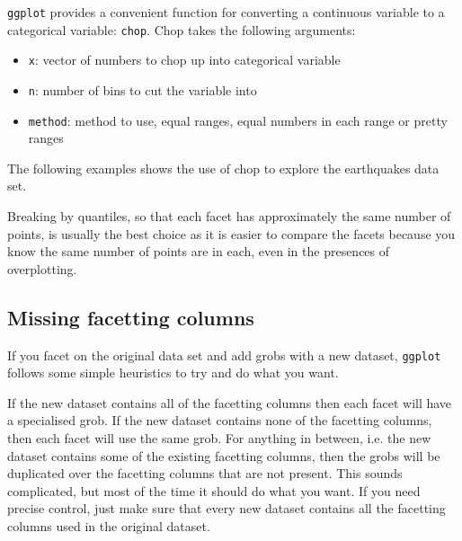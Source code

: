 {\tt ggplot} provides a convenient function for converting a continuous variable to a categorical variable: {\tt chop}.  Chop takes the following arguments:

\begin{itemize}
	\item {\tt x}: vector of numbers to chop up into categorical variable
	\item {\tt n}: number of bins to cut the variable into
	\item {\tt method}: method to use, equal ranges, equal numbers in each range or pretty ranges
\end{itemize}

The following examples shows the use of chop to explore the earthquakes data set.


Breaking by quantiles, so that each facet has approximately the same number of points, is usually the best choice as it is easier to compare the facets because you know the same number of points are in each, even in the presences of overplotting.

\subsection{Missing facetting columns}\label{sub:missing_facetting_columsn}

If you facet on the original data set and add grobs with a new dataset, {\tt ggplot} follows some simple heuristics to try and do what you want.  

If the new dataset contains all of the facetting columns then each facet will have a specialised grob. If the new dataset contains none of the facetting columns, then each facet will use the same grob.  For anything in between, i.e. the new dataset contains some of the existing facetting columns, then the grobs will be duplicated over the facetting columns that are not present.  This sounds complicated, but most of the time it should do what you want.  If you need precise control, just make sure that every new dataset contains all the facetting columns used in the original dataset.



